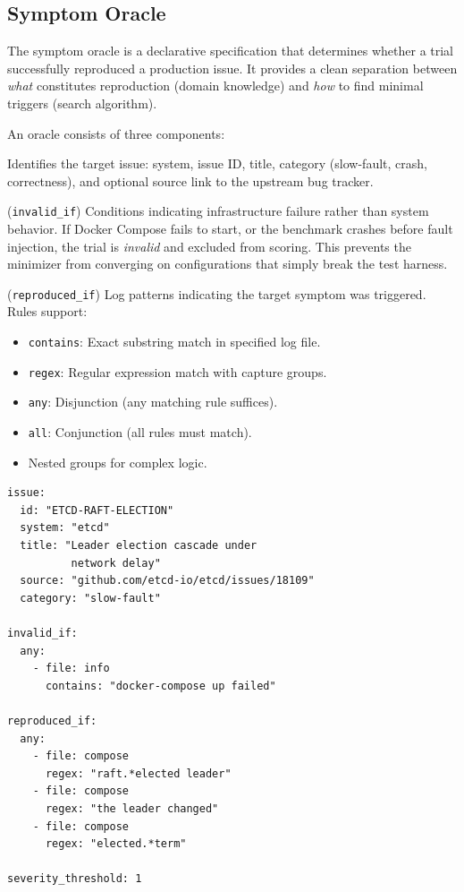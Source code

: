 \subsection{Symptom Oracle}
\label{sec:oracle}

The symptom oracle is a declarative specification that determines whether a
trial successfully reproduced a production issue. It provides a clean
separation between \emph{what} constitutes reproduction (domain knowledge)
and \emph{how} to find minimal triggers (search algorithm).

An oracle consists of three components:

 Identifies the target issue: system, issue ID, title,
category (slow-fault, crash, correctness), and optional source link to the
upstream bug tracker.

 (\texttt{invalid\_if}) Conditions indicating infrastructure
failure rather than system behavior. If Docker Compose fails to start, or the
benchmark crashes before fault injection, the trial is \emph{invalid} and
excluded from scoring. This prevents the minimizer from converging on
configurations that simply break the test harness.

 (\texttt{reproduced\_if}) Log patterns indicating
the target symptom was triggered. Rules support:
\begin{itemize}[leftmargin=*,topsep=2pt,itemsep=1pt]
  \item \texttt{contains}: Exact substring match in specified log file.
  \item \texttt{regex}: Regular expression match with capture groups.
  \item \texttt{any}: Disjunction (any matching rule suffices).
  \item \texttt{all}: Conjunction (all rules must match).
  \item Nested groups for complex logic.
\end{itemize}

\begin{lstlisting}[language={},caption={Example oracle for etcd Raft election.},label={lst:oracle}]
issue:
  id: "ETCD-RAFT-ELECTION"
  system: "etcd"
  title: "Leader election cascade under
          network delay"
  source: "github.com/etcd-io/etcd/issues/18109"
  category: "slow-fault"

invalid_if:
  any:
    - file: info
      contains: "docker-compose up failed"

reproduced_if:
  any:
    - file: compose
      regex: "raft.*elected leader"
    - file: compose
      regex: "the leader changed"
    - file: compose
      regex: "elected.*term"

severity_threshold: 1
\end{lstlisting}

